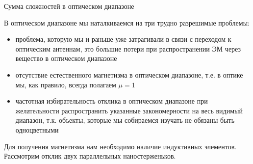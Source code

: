 \documentclass[9pt, compress, xcolor=table]{beamer}
\begin{document}
\begin{frame}{Сумма сложностей в оптическом диапазоне}

В оптическом диапазоне мы наталкиваемся на три трудно разрешимые проблемы:

\begin{itemize}
\item проблема, которую мы и раньше уже затрагивали в связи с переходом к оптическим антеннам, это большие потери при распространении ЭМ через вещество в оптическом диапазоне

\item отсутствие естественного магнетизма в оптическом диапазоне, т.е. в оптике мы, как правило, всегда полагаем $\mu=1$

\item частотная избирательность отклика в оптическом диапазоне при желательности распространить указанные закономерности на весь видимый диапазон, т.к. объекты, которые мы собираемся изучать не обязаны быть одноцветными
\end{itemize}

Для получения магнетизма нам необходимо наличие индуктивных элементов. Рассмотрим отклик двух параллельных наностерженьков.  

\end{frame}
\end{document}
